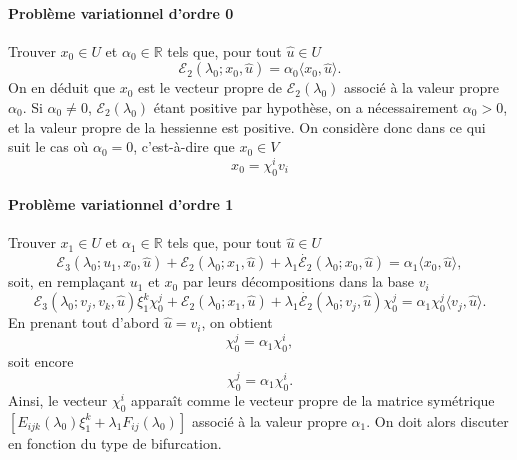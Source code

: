 \documentclass{article}
\begin{document}
\paragraph{Problème variationnel d'ordre 0}Trouver $x_0∈U$ et
$\alpha_0∈\mathbb{R}$ tels que, pour tout $\hat{u}∈U$
\begin{equation} ℰ_2 (λ_0 ; x_0, \hat{u}) = \alpha_0  \langle x_0, \hat{u}
   \rangle . \end{equation}
On en déduit que $x_0$ est le vecteur propre de $ℰ_2
(λ_0)$ associé à la valeur propre $\alpha_0$. Si $\alpha_0 \neq
0$, $ℰ_2  (λ_0)$ étant positive par hypothèse, on a
nécessairement $\alpha_0 > 0$, et la valeur propre de la hessienne est
positive. On considère donc dans ce qui suit le cas où $\alpha_0 = 0$,
c'est-à-dire que $x_0∈V$
\begin{equation} x_0 = \chi_0^i v_i \end{equation}


\paragraph{Problème variationnel d'ordre 1}Trouver $x_1∈U$ et
$\alpha_1∈\mathbb{R}$ tels que, pour tout $\hat{u}∈U$
\begin{equation} ℰ_3 (λ_0 ; u_1, x_0, \hat{u}) +ℰ_2 (λ_0 ;
   x_1, \hat{u}) + λ_1  \dot{ℰ_2} (λ_0 ; x_0, \hat{u}) =
   \alpha_1  \langle x_0, \hat{u} \rangle, \end{equation}
soit, en rempla{\c c}ant $u_1$ et $x_0$ par leurs décompositions dans la
base $v_i$
\begin{equation} ℰ_3 (λ_0 ; v_j, v_k, \hat{u}) ξ_1^k \chi_0^j
   +ℰ_2 (λ_0 ; x_1, \hat{u}) + λ_1  \dot{ℰ_2}
   (λ_0 ; v_j, \hat{u}) \chi_0^j = \alpha_1 \chi_0^j  \langle v_j,
   \hat{u} \rangle . \end{equation}
En prenant tout d'abord $\hat{u} = v_i$, on obtient
\begin{equation} [ℰ_3 (λ_0 ; v_i, v_j, v_k) ξ_1^k + λ_1
   \dot{ℰ_2} (λ_0 ; v_i, v_j)] \chi_0^j = \alpha_1 \chi_0^i,
\end{equation}
soit encore
\begin{equation} [E_{i  j  k} (λ_0) ξ_1^k + λ_1 F_{i
   j} (λ_0)] \chi_0^j = \alpha_1 \chi_0^i . \end{equation}
Ainsi, le vecteur $\chi_0^i$ apparaît comme le vecteur propre de la
matrice symétrique $[E_{i  j  k} (λ_0) ξ_1^k +
λ_1 F_{i  j} (λ_0)]$ associé à la valeur propre
$\alpha_1$. On doit alors discuter en fonction du type de bifurcation.
\end{document}

